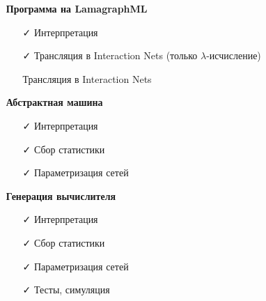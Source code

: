 \documentclass[aspectratio=169]{beamer}
\begin{document}
\begin{frame}
    \begin{itemize}
        \item[] \textbf{Программа на LamagraphML}
              \begin{itemize}
                  \item[\faCheck] Интерпретация
                  \item[\faCheck] Трансляция в Interaction Nets (только $\lambda$-исчисление)
                  \item[\faCogs] Трансляция в Interaction Nets
              \end{itemize}
        \item[] \textbf{Абстрактная машина}
              \begin{itemize}
                  \item[\faCheck] Интерпретация
                  \item[\faCheck] Сбор статистики
                  \item[\faCheck] Параметризация сетей
              \end{itemize}
        \item[] \textbf{Генерация вычислителя}
              \begin{itemize}
                  \item[\faCheck] Интерпретация
                  \item[\faCheck] Сбор статистики
                  \item[\faCheck] Параметризация сетей
                  \item[\faCheck] Тесты, симуляция
              \end{itemize}
    \end{itemize}

\end{frame}
\end{document}
